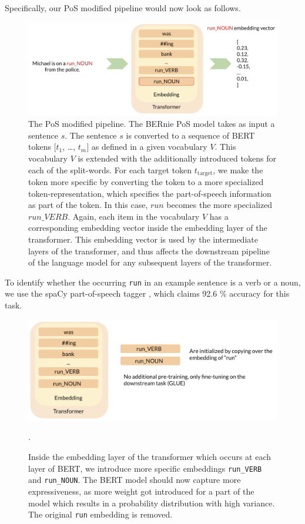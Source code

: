 \documentclass[a4paper,12pt,twoside,openright]{report}
\begin{document}
Specifically, our PoS modified pipeline would now look as follows.

\begin{figure}[H]
	\center
  \includegraphics[width=\linewidth]{./assets/experiments/pipeline_tokenizer_BERnie_POS_input.png}
  \caption{The PoS modified pipeline. 
  The BERnie PoS model takes as input a sentence $s$. The sentence $s$ is converted to a sequence of BERT tokens $[t_1$, \ldots, $t_m]$ as defined in a given vocabulary $V$.
    This vocabulary $V$ is extended with the additionally introduced tokens for each of the split-words.
For each target token $t_{\text{target}}$, we make the token more specific by converting the token to a more specialized token-representation, which specifies the part-of-speech information as part of the token.
In this case, $run$ becomes the more specialized $run\_ VERB$.
Again, each item in the vocabulary $V$ has a corresponding embedding vector inside the embedding layer of the transformer.
This embedding vector is used by the intermediate layers of the transformer, and thus affects the downstream pipeline of the language model for any subsequent layers of the transformer.
}
  \label{fig:BERnie_POS_pipeline}
\end{figure}


To identify whether the occurring \Verb#run# in an example sentence is a verb or a noun, we use the spaCy part-of-speech tagger \cite{spacyb}, which claims 92.6 \% accuracy for this task.

\begin{figure}[H]
	\center
  \includegraphics[width=\linewidth]{./assets/experiments/pipeline_model_BERnie_POS_initialization.png}
  \caption{Inside the embedding layer of the transformer which occurs at each layer of BERT, we introduce more specific embeddings \texttt{run\_VERB} and \texttt{run\_NOUN}. The BERT model should now capture more expressiveness, as more weight got introduced for a part of the model which results in a probability distribution with high variance. The original \texttt{run} embedding is removed.}.
  \label{fig:BERnie_POS_initialization}
\end{figure}
\end{document}
